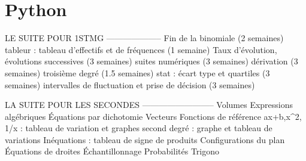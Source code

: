 \part{Python}


%







\printnomenclature

\printindex




LE SUITE POUR 1STMG
--------------------
Fin de la binomiale (2 semaines)
tableur : tableau d'effectifs et de fréquences  (1 semaine)
Taux d'évolution, évolutions successives    (3 semaines)
suites numériques   (3 semaines)
dérivation  (3 semaines)
troisième degré (1.5 semaines)
stat : écart type et quartiles  (3 semaines)
intervalles de fluctuation et prise de décision (3 semaines)

LA SUITE POUR LES SECONDES
--------------------------
Volumes
Expressions algébriques
Équations par dichotomie
Vecteurs
Fonctions de référence ax+b,x^2, 1/x : tableau de variation et graphes
second degré : graphe et tableau de variations
Inéquations : tableau de signe de produits
Configurations du plan
Équations de droites
Échantillonnage
Probabilités
Trigono


